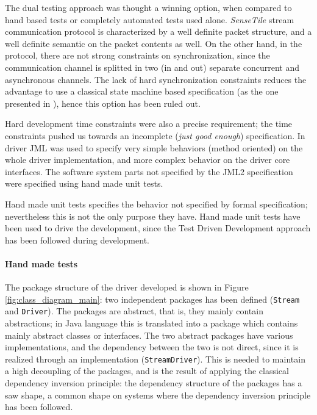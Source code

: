 \documentclass{article} \usepackage{times}
\newcommand{\lil}[1]{\texttt{\lstinline|#1|}}
\newcommand{\ST}{\emph{SenseTile}\xspace}
\begin{document}
The dual testing approach was thought a winning option, when compared
to hand based tests or completely automated tests used alone.  \ST
stream communication protocol is characterized by a well definite
packet structure, and a well definite semantic on the packet contents
as well.  On the other hand, in the protocol, there are not strong
constraints on synchronization, since the communication channel is
splitted in two (in and out) separate concurrent and asynchronous
channels.  The lack of hard synchronization constraints reduces the
advantage to use a classical state machine based specification (as the
one presented in \cite{Hubbers2004}), hence this option has been ruled
out.

Hard development time constraints were also a precise requirement; the
time constraints pushed us towards an incomplete (\emph{just good
  enough}) specification.  In \STSB driver JML was used to specify
very simple behaviors (method oriented) on the whole driver
implementation, and more complex behavior on the driver core
interfaces.  The software system parts not specified by the JML2
specification were specified using hand made unit tests.

Hand made unit tests specifies the behavior not specified by formal
specification; nevertheless this is not the only purpose they have.
Hand made unit tests have been used to drive the development, since
the Test Driven Development approach\cite{beck2003test} has been
followed during development.

\paragraph*{Hand made tests}

The package structure of the driver developed is shown in Figure
\ref{fig:class_diagram_main}: two independent packages has been
defined (\lil{Stream} and \lil{Driver}).  The packages are abstract,
that is, they mainly contain abstractions; in Java language this is
translated into a package which contains mainly abstract classes or
interfaces.  The two abstract packages have various implementations,
and the dependency between the two is not direct, since it is realized
through an implementation (\lil{StreamDriver}).  This is needed to
maintain a high decoupling of the packages, and is the result of
applying the classical dependency inversion
principle\cite{martin1996dependency}: the dependency structure of the
packages has a saw shape, a common shape on systems where the
dependency inversion principle has been followed.
\end{document}
